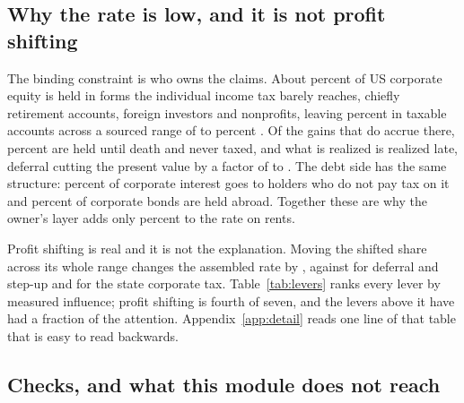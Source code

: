 \subsection{Why the rate is low, and it is not profit shifting}

The binding constraint is who owns the claims. About  percent of US
corporate equity is held in forms the individual income tax barely reaches, chiefly retirement
accounts, foreign investors and nonprofits, leaving  percent in taxable
accounts across a sourced range of  to  percent
\citep{RosenthalAustin2016,RosenthalBurke2020,RosenthalMucciolo2024}. Of the gains that do accrue
there,  percent are held until death and never taxed, and what is
realized is realized late, deferral cutting the present value by a factor of
 to  \citep{Gravelle2022}. The debt side has the same
structure:  percent of corporate interest goes to holders who do not pay
tax on it and  percent of corporate bonds are held abroad. Together these
are why the owner's layer adds only  percent to the rate on rents.

Profit shifting is real and it is not the explanation. Moving the shifted share across its whole
range changes the assembled rate by , against  for
deferral and step-up and  for the state corporate tax.
Table~\ref{tab:levers} ranks every lever by measured influence; profit shifting is fourth of
seven, and the levers above it have had a fraction of the attention.
Appendix~\ref{app:detail} reads one line of that table that is easy to read backwards.

\begin{table}[htbp]
\centering
\caption{The levers, ranked by measured influence on the assembled rate. Each is moved across its
whole sourced or swept range with the others at central values. Scenario.}
\label{tab:levers}

\end{table}

\subsection{Checks, and what this module does not reach}

